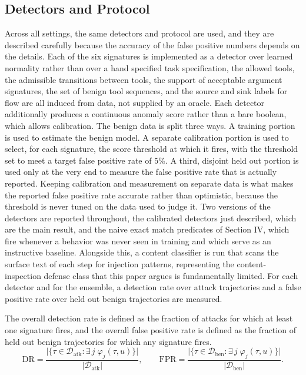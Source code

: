 \documentclass[journal]{IEEEtran}
\theoremstyle{remark}
\begin{document}
\subsection{Detectors and Protocol}
Across all settings, the same detectors and protocol are used, and they are described carefully because the accuracy of the false positive numbers depends on the details. Each of the six signatures is implemented as a detector over learned normality rather than over a hand specified task specification, the allowed tools, the admissible transitions between tools, the support of acceptable argument signatures, the set of benign tool sequences, and the source and sink labels for flow are all induced from data, not supplied by an oracle. Each detector additionally produces a continuous anomaly score rather than a bare boolean, which allows calibration. The benign data is split three ways. A training portion is used to estimate the benign model. A separate calibration portion is used to select, for each signature, the score threshold at which it fires, with the threshold set to meet a target false positive rate of 5\%. A third, disjoint held out portion is used only at the very end to measure the false positive rate that is actually reported. Keeping calibration and measurement on separate data is what makes the reported false positive rate accurate rather than optimistic, because the threshold is never tuned on the data used to judge it. Two versions of the detectors are reported throughout, the calibrated detectors just described, which are the main result, and the naive exact match predicates of Section IV, which fire whenever a behavior was never seen in training and which serve as an instructive baseline. Alongside this, a content classifier is run that scans the surface text of each step for injection patterns, representing the content-inspection defense class that this paper argues is fundamentally limited. For each detector and for the ensemble, a detection rate over attack trajectories and a false positive rate over held out benign trajectories are measured. 

The overall detection rate is defined as the fraction of attacks for which at least one signature fires, and the overall false positive rate is defined as the fraction of held out benign trajectories for which any signature fires.
\[
\mathrm{DR} = \frac{\bigl|\{\tau\in\mathcal{D}_{\mathrm{atk}} : \exists\, j\; \varphi_j(\tau,u)\}\bigr|}{|\mathcal{D}_{\mathrm{atk}}|}, \qquad
\mathrm{FPR} = \frac{\bigl|\{\tau\in\mathcal{D}_{\mathrm{ben}} : \exists\, j\; \varphi_j(\tau,u)\}\bigr|}{|\mathcal{D}_{\mathrm{ben}}|}.
\]
\end{document}
